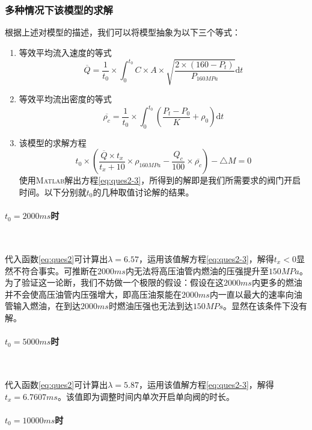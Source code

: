 \documentclass{cumcmthesis}
\begin{document}
\subsubsection{多种情况下该模型的求解}
根据上述对模型的描述，我们可以将模型抽象为以下三个等式：
\begin{enumerate}
	\item 等效平均流入速度的等式
	\begin{equation}
	\overline{Q} = \frac{1}{t_{0}}\times \int_{0}^{t_{0}} C\times A\times \sqrt{\frac{2\times (160-P_{t})}{P_{160MPa}}}{\text{d}t}\label{eq:ques2-1}	
	\end{equation}
	\item 等效平均流出密度的等式
	\begin{equation}
	\overline{\rho_{c}} = \frac{1}{t_{0}}\times \int_{0}^{t_{0}} (\frac{P_{t}-P_{0}}{K}+\rho_{0}){\text{d}t}\label{eq:ques2-2}	
	\end{equation}
	\item 该模型的求解方程
	\begin{equation}
	t_{0}\times(\frac{\overline{Q}\times t_{x}}{t_{x}+10}\times \rho_{160MPa}-\frac{Q_{c}}{100}\times \overline{\rho_{c}})-\triangle M = 0\label{eq:ques2-3}	
	\end{equation}
	使用\textsc{Matlab}解出方程\cref{eq:ques2-3}，所得到的解即是我们所需要求的阀门开启时间。以下分别就$t_{0}$的几种取值讨论解的结果。
\end{enumerate}
\paragraph{$t_{0}=2000ms$时}~{}

代入函数\cref{eq:ques2}可计算出$\lambda=6.57$，运用该值解方程\cref{eq:ques2-3}，解得$t_{x} <0$显然不符合事实。可推断在$2000ms$内无法将高压油管内燃油的压强提升至$150MPa$。为了验证这一论断，我们不妨做一个极限的假设：假设在这$2000ms$内更多的燃油并不会使高压油管内压强增大，即高压油泵能在$2000ms$内一直以最大的速率向油管输入燃油，在到达$2000ms$时燃油压强也无法到达$150MPs$。显然在该条件下没有解。

\paragraph{$t_{0}=5000ms$时}~{}

代入函数\cref{eq:ques2}可计算出$\lambda=5.87$，运用该值解方程\cref{eq:ques2-3}，解得$t_{x} = 6.7607ms$。该值即为调整时间内单次开启单向阀的时长。
\paragraph{$t_{0}=10000ms$时}~{}
\end{document}
